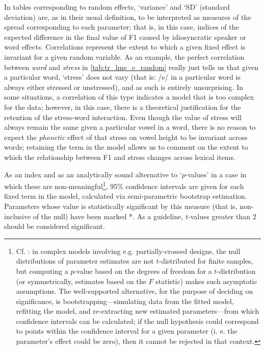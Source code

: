 In tables corresponding to random effects, `variance' and `SD' (standard deviation) are, as in their usual definition, to be interpreted as measures of the spread corresponding to each parameter; that is, in this case, indices of the expected difference in the final value of F1 caused by idiosyncratic speaker or word effects. Correlations represent the extent to which a given fixed effect is invariant for a given random variable. As an example, the perfect correlation between \emph{word} and \emph{stress} in \cref{tab:tr_lme_e_random} really just tells us that given a particular word, `stress' does not vary (that is: /e/ in a particular word is always either stressed or unstressed), and as such is entirely unsurprising. In some situations, a correlation of this type indicates a model that is too complex for the data; however, in this case, there is a theoretical justification for the retention of the stress-word interaction. Even though the value of stress will always remain the same given a particular vowel in a word, there is no reason to expect the \emph{phonetic} effect of that stress on vowel height to be invariant across words; retaining the term in the model allows us to comment on the extent to which the relationship between F1 and stress changes across lexical items.

As an index and as an analytically sound alternative to `$p$-values' in a case in which these are non-meaningful\footnote{Cf. \cite{lme4}: in complex models involving e.g. partially-crossed designs, the null distributions of parameter estimates are not $t$-distributed for finite samples, but computing a $p$-value based on the degrees of freedom for a $t$-distribution (or symmetrically, estimates based on the $F$ statistic) makes such asymptotic assumptions. The well-supported alternative, for the purpose of deciding on significance, is bootstrapping---simulating data from the fitted model, refitting the model, and re-extracting new estimated parameters---from which confidence intervals can be calculated; if the null hypothesis could correspond to points within the confidence interval for a given parameter (i. e. the parameter's effect could be zero), then it cannot be rejected in that context.}, 95\% confidence intervals are given for each fixed term in the model, calculated via semi-parametric bootstrap estimation. Parameters whose value is statistically significant by this measure (that is, non-inclusive of the null) have been marked *. As a guideline, $t$-values greater than 2 should be considered significant.

